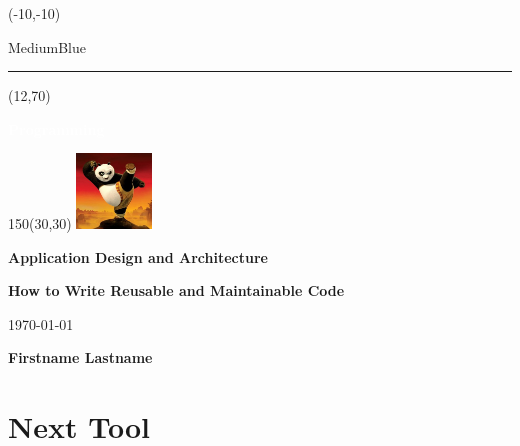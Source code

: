 \documentclass{report}
\begin{document}
    \setlength{\TPHorizModule}{1mm}
    \setlength{\TPVertModule}{1mm}

    \begin{titlepage}
        \begin{textblock}{50}(-10,-10)
            \begin{color}{MediumBlue}
                \rule{3cm}{30cm} %
            \end{color}
        \end{textblock}

        \begin{textblock}{20}(12,70) %
            \begin{rotate}{90}
            {\huge\bfseries \textcolor{white}{Programming}}
            \end{rotate}
        \end{textblock}

        \begin{textblock}{150}(30,30) %
            \includegraphics[height=20mm]{images/panda}\medskip

            {\huge\bfseries Application Design and Architecture }\medskip

            {\Large\bfseries How to Write Reusable and Maintainable Code }\medskip

            {\large\today}\vspace{10mm}

            {\large\bfseries Firstname Lastname}
        \end{textblock}

        \setlength{\cftbeforetoctitleskip}{300pt} %
        \setlength{\cftaftertoctitleskip}{20pt}
        \tableofcontents

        \thispagestyle{empty} %
	\end{titlepage}


    \begingroup
    \let\clearpage\relax
    \chapter{Next Tool}
    \endgroup
    \thispagestyle{fancy} %
\end{document}
